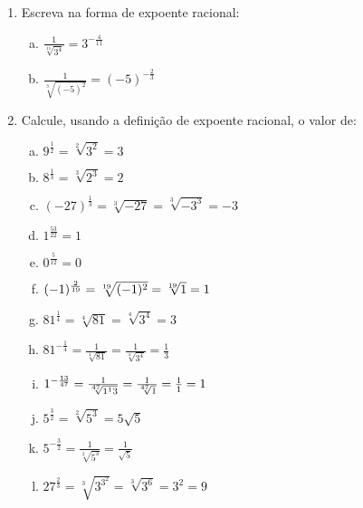 \documentclass[a4paper,14pt]{article}
\begin{document}
\begin{multicols}{2}
\begin{enumerate}
\begin{enumerate}[a)]
        \end{enumerate}
        \item Escreva na forma de expoente racional:
        \begin{enumerate}[a)]
        	\item $\frac{1}{\sqrt[11]{3^4}} = 3^{-\frac{4}{11}}$ \\
        	\item $\frac{1}{\sqrt[3]{(-5)^2}} = (-5)^{-\frac{2}{3}}$ \\
        \end{enumerate}
        \item Calcule, usando a definição de expoente racional, o valor de:
        \begin{enumerate}[a)]
        	\item $9^\frac{1}{2} = \sqrt[2]{3^2} = 3$ \\
        	\item $8^\frac{1}{3} = \sqrt[3]{2^3} = 2$ \\
        	\item $(-27)^\frac{1}{3} = \sqrt[3]{-27} = \sqrt[3]{-3^3} = -3$ \\
        	\item $1^\frac{53}{22} = 1$ \\
        	\item $0^\frac{5}{12} = 0$ \\
        	\item $(-1)^\frac{2}{19} = \sqrt[19]{(-1)^2} = \sqrt[19]{1} \\= 1$ \\
        	\item $81^\frac{1}{4} = \sqrt[4]{81} = \sqrt[4]{3^4} = 3$ \\
        	\item $81^{-\frac{1}{4}} = \frac{1}{\sqrt[4]{81}} = \frac{1}{\sqrt[4]{3^4}} = \frac{1}{3}$ \\
        	\item $1^{-\frac{13}{47}} = \frac{1}{\sqrt[47]{1^13}} = \frac{1}{\sqrt[47]{1}} = \frac{1}{1} \\= 1$ \\
        	\item $5^\frac{3}{2} = \sqrt[2]{5^3} = 5 \sqrt{5}$ \\
        	\item $5^{-\frac{3}{2}} = \frac{1}{\sqrt[2]{5^3}} = \frac{1}{\sqrt{5}}$ \\
        	\item $27^\frac{2}{3} = \sqrt[3]{3^{3^2}} = \sqrt[3]{3^6} = 3^2 = 9$ \\

\end{enumerate}
\end{enumerate}
\end{multicols}
\end{document}
